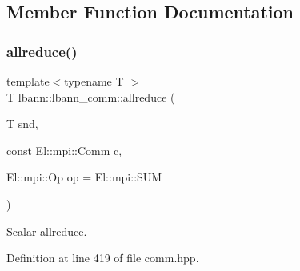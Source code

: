 \subsection{Member Function Documentation}
\mbox{\label{classlbann_1_1lbann__comm_af5631e5f0f54e4df4958eba9df2599ef}} 
\subsubsection{\texorpdfstring{allreduce()}{allreduce()}\hspace{0.1cm}{\footnotesize\ttfamily [1/4]}}
{\footnotesize\ttfamily template$<$typename T $>$ \\
T lbann\+::lbann\+\_\+comm\+::allreduce (\begin{DoxyParamCaption}\item[{T}]{snd,  }\item[{const El\+::mpi\+::\+Comm}]{c,  }\item[{El\+::mpi\+::\+Op}]{op = {\ttfamily El\+:\+:mpi\+:\+:SUM} }\end{DoxyParamCaption})\hspace{0.3cm}{\ttfamily [inline]}}

Scalar allreduce. 

Definition at line 419 of file comm.\+hpp.


